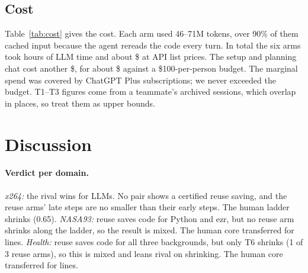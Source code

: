 \documentclass[acmsmall,nonacm]{acmart}
\begin{document}
\begin{table}[ht]
\caption{Race. Regret: 0 = picked the best configuration, 1 = median. x264: same 200 unseen configurations, 10 evaluations (rank@20 with 20), seeds 1--10. $^*$Read every recorded result, a lookup rather than a search: not comparable.}\label{tab:race}
\footnotesize\setlength\tabcolsep{3pt}\resizebox{\linewidth}{!}{}
\end{table}

\subsection{Cost}
Table~\ref{tab:cost} gives the cost. Each arm used 46--71M tokens, over 90\% of them cached input because the agent rereads the code every turn. In total the six arms took \hoursRuns{} hours of LLM time and about \$\costRuns{} at API list prices. The setup and planning chat cost another \$\costSetup, for about \$\costAll{} against a \$100-per-person budget. The marginal spend was covered by ChatGPT Plus subscriptions; we never exceeded the budget. T1--T3 figures come from a teammate's archived sessions, which overlap in places, so treat them as upper bounds.

\begin{table}[ht]
\caption{Cost per treatment over 9 ladders (Codex logs; \texttt{results/cost.csv}).}\label{tab:cost}
\footnotesize
\end{table}

\section{Discussion}\label{sec:discussion}

\paragraph{Verdict per domain.}
\emph{x264:} the rival wins for LLMs. No pair shows a certified reuse saving, and the reuse arms' late steps are no smaller than their early steps. The human ladder shrinks (0.65).
\emph{NASA93:} reuse saves code for Python and ezr, but no reuse arm shrinks along the ladder, so the result is mixed. The human core transferred for \tSevenNasa{} lines.
\emph{Health:} reuse saves code for all three backgrounds, but only T6 shrinks (1 of 3 reuse arms), so this is mixed and leans rival on shrinking. The human core transferred for \tSevenHealth{} lines.
\end{document}
